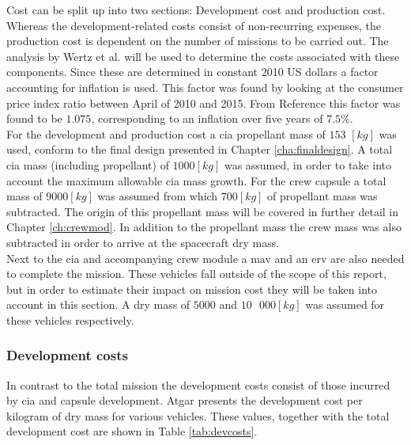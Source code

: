 Cost can be split up into two sections: Development cost and production cost. Whereas the development-related costs consist of non-recurring expenses, the production cost is dependent on the number of missions to be carried out. The analysis by Wertz et al. \cite{Wertz2011} will be used to determine the costs associated with these components. Since these are determined in constant 2010 US dollars a factor accounting for inflation is used. This factor was found by looking at the consumer price index ratio between April of 2010 and 2015. From Reference \cite{Crawford2015} this factor was found to be $1.075$, corresponding to an inflation over five years of $7.5\%$.\\
For the development and production cost a \gls{cia} propellant mass of $153$ $\left[kg\right]$ was used, conform to the final design presented in Chapter \ref{cha:finaldesign}. A total \gls{cia} mass (including propellant) of $1000 \left[kg\right]$ was assumed, in order to take into account the maximum allowable \gls{cia} mass growth. For the crew capsule a total mass of $9000 \left[kg\right]$ was assumed from which $700 \left[kg\right]$ of propellant mass was subtracted. The origin of this propellant mass will be covered in further detail in Chapter \ref{ch:crewmod}. In addition to the propellant mass the crew mass was also subtracted in order to arrive at the spacecraft dry mass.\\
Next to the \gls{cia} and accompanying crew module a \gls{mav} and an \gls{erv} are also needed to complete the mission. These vehicles fall outside of the scope of this report, but in order to estimate their impact on mission cost they will be taken into account in this section. A dry mass of $5000$ and $10\mbox{ }000 \left[kg\right]$ was assumed for these vehicles respectively.

\subsubsection{Development costs}
In contrast to the total mission the development costs consist of those incurred by \gls{cia} and capsule development. Atgar \cite[p.296]{Wertz2011} presents the development cost per kilogram of dry mass for various vehicles. These values, together with the total development cost are shown in Table \ref{tab:devcosts}.

